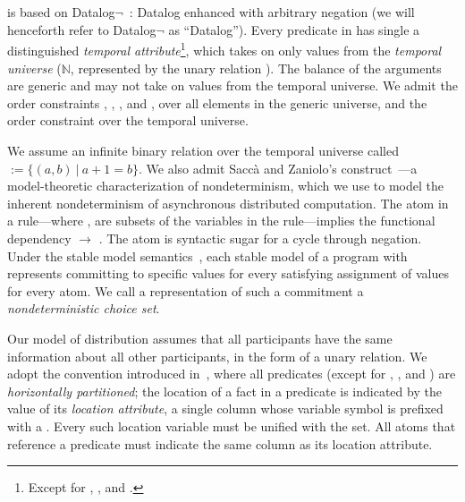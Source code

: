 \section{\large \bf \lang}
\label{sec:lang}

\lang is based on Datalog$\lnot$~\cite{ullmanbook}: Datalog enhanced with arbitrary negation (we will henceforth refer to Datalog$\lnot$ as ``Datalog'').  Every predicate in \lang has single a distinguished {\em temporal attribute}\footnote{Except for , , and .}, which takes on only values from the {\em temporal universe} ($\mathbb{N}$,
represented by the unary relation ).
The balance of the arguments are generic and may not take on values from the temporal universe.  We admit the order constraints \dedalus{<}, \dedalus{=}, \dedalus{!=}, and \dedalus{<=}, over all elements in the generic universe, and the order constraint \dedalus{<} over the temporal universe.

We assume an infinite binary relation over the temporal universe
called  $:= \{(a,b) \ | \ a + 1 = b\}$.  We also admit Sacc\`{a} and Zaniolo's  construct~\cite{sacca-zaniolo}---a model-theoretic characterization of nondeterminism, which we use to model the inherent nondeterminism of asynchronous distributed computation.  The atom  in a rule---where ,  are subsets of the variables in the rule---implies the functional dependency  $\rightarrow$ .  The  atom is syntactic sugar for a cycle through negation.  Under the stable model semantics~\cite{stable-model}, each stable model of a program with  represents committing to specific  values for every satisfying assignment of  values for every  atom.  We call a representation of such a commitment a {\em nondeterministic choice set}.

Our model of distribution assumes that all participants have the same information about all other participants, in the form of a unary  relation.  We adopt the convention introduced in~\cite{Loo:2005}, where all predicates (except for , , and ) are {\em horizontally partitioned};  the location of a fact in a predicate is indicated by the value of its {\em location attribute}, a single column whose variable symbol is prefixed with a \dedalus{\#}.  Every such location variable must be unified with the  set.  All atoms that reference a predicate must indicate the same column as its location attribute.

